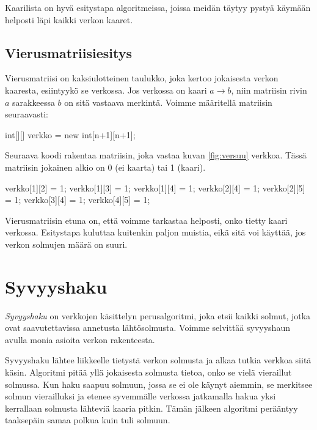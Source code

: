 Kaarilista on hyvä esitystapa algoritmeissa,
joissa meidän täytyy pystyä käymään helposti läpi
kaikki verkon kaaret.

\subsection{Vierusmatriisiesitys}

Vierusmatriisi on kaksiulotteinen taulukko,
joka kertoo jokaisesta verkon kaaresta,
esiintyykö se verkossa.
Jos verkossa on kaari $a \rightarrow b$,
niin matriisin rivin $a$ sarakkeessa $b$
on sitä vastaava merkintä.
Voimme määritellä matriisin seuraavasti:

\begin{code}
int[][] verkko = new int[n+1][n+1];
\end{code}

Seuraava koodi rakentaa matriisin,
joka vastaa kuvan \ref{fig:versuu} verkkoa.
Tässä matriisin jokainen alkio on 0 (ei kaarta)
tai 1 (kaari).

\begin{code}
verkko[1][2] = 1;
verkko[1][3] = 1;
verkko[1][4] = 1;
verkko[2][4] = 1;
verkko[2][5] = 1;
verkko[3][4] = 1;
verkko[4][5] = 1;
\end{code}

Vierusmatriisin etuna on, että voimme tarkastaa helposti,
onko tietty kaari verkossa.
Esitystapa kuluttaa kuitenkin paljon muistia,
eikä sitä voi käyttää, jos verkon solmujen määrä on suuri.

\section{Syvyyshaku}

\emph{Syvyyshaku} on verkkojen käsittelyn perusalgoritmi,
joka etsii kaikki solmut, jotka ovat saavutettavissa
annetusta lähtösolmusta.
Voimme selvittää syvyyshaun avulla monia asioita
verkon rakenteesta.

Syvyyshaku lähtee liikkeelle tietystä verkon solmusta
ja alkaa tutkia verkkoa siitä käsin.
Algoritmi pitää yllä jokaisesta solmusta tietoa,
onko se vielä vieraillut solmussa.
Kun haku saapuu solmuun, jossa se ei ole käynyt aiemmin,
se merkitsee solmun vierailluksi ja
etenee syvemmälle verkossa jatkamalla hakua
yksi kerrallaan solmusta lähteviä kaaria pitkin.
Tämän jälkeen algoritmi perääntyy taaksepäin
samaa polkua kuin tuli solmuun.

